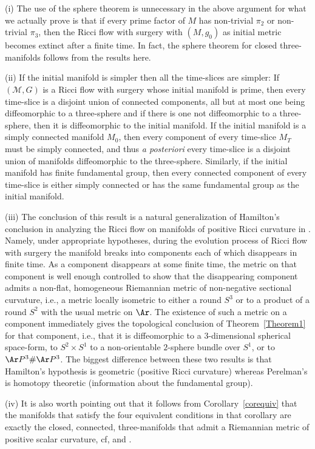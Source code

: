 \begin{remark}
\label{rem:extinction-remarks}
(i) The use of the sphere theorem is unnecessary in the above
argument for what we actually prove is that if every prime factor of
$M$ has non-trivial $\pi_2$ or non-trivial $\pi_3$, then the Ricci
flow with surgery with $(M,g_0)$ as initial metric becomes extinct
after a finite time. In fact, the sphere theorem for closed
three-manifolds follows from the results here.

\noindent (ii)  If the initial manifold is simpler then all the
time-slices are simpler: If $({\mathcal M},G)$ is a Ricci flow with
surgery whose initial manifold is prime, then every time-slice is a
disjoint union of connected components, all but at most one being
diffeomorphic to a three-sphere and if there is one not
diffeomorphic to a three-sphere, then it is diffeomorphic to the
initial manifold. If the initial manifold is a simply connected
manifold $M_0$, then every component of every time-slice $M_T$ must
be simply connected, and thus {\em a posteriori} every time-slice is
a disjoint union of manifolds diffeomorphic to the three-sphere.
Similarly, if the initial manifold has finite fundamental group,
then every connected component of every time-slice is either simply
connected or has the same fundamental group as the initial manifold.

\noindent (iii) The conclusion of this result is a natural
generalization of Hamilton's conclusion in analyzing the Ricci flow
on manifolds of positive Ricci curvature in \cite{Hamilton3MPRC}.
Namely, under appropriate hypotheses, during the evolution process
of Ricci flow with surgery the manifold breaks into components each
of which disappears in finite time. As a component disappears at
some finite time, the metric on that component is well enough
controlled to show that the disappearing component admits a
non-flat, homogeneous Riemannian metric of non-negative sectional
curvature, i.e., a metric locally isometric to either a round $S^3$
or to a product of a round $S^2$ with the usual metric on $ \Ar$.
The existence of such a metric on a component immediately gives the
topological conclusion of Theorem~\ref{Theorem1} for that component,
i.e., that it is diffeomorphic to a $3$-dimensional spherical
space-form, to $S^2\times S^1$ to a non-orientable $2$-sphere bundle
over $S^1$, or to $\Ar P^3\#\Ar P^3$. The biggest difference between
these two results is that Hamilton's hypothesis is geometric
(positive Ricci curvature) whereas Perelman's is homotopy theoretic
(information about the fundamental group).

\noindent (iv) It is also worth pointing out that it follows from
Corollary~\ref{corequiv} that the manifolds that satisfy the four equivalent
conditions in that corollary are exactly the closed, connected, three-manifolds
that admit a Riemannian metric of positive scalar curvature, cf,
\cite{SchoenYau2} and \cite {GromovLawson}.
\end{remark}



